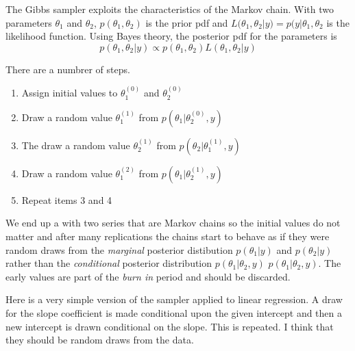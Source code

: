 \documentclass[12pt, a4paper, oneside]{article}\usepackage[]{graphicx}\usepackage[]{color}
\begin{document}
The Gibbs sampler exploits the characteristics of the Markov chain.  With two parameters $\theta_1$ and $\theta_2$, $p(\theta_1, \theta_2)$ is the prior pdf and $L(\theta_1, \theta_2 | y) = p(y | \theta_1, \theta_2$ is the likelihood function.  Using Bayes theory, the posterior pdf for the parameters is 
\begin{equation}
p(\theta_1, \theta_2| y) \propto p(\theta_1, \theta_2)L(\theta_1, \theta_2| y)
\end{equation}

There are a numbrer of steps. 
\begin{enumerate}
\item Assign initial values to $\theta_1^{(0)}$ and $\theta_2^{(0)}$
\item Draw a random value $\theta_1^{(1)}$ from $p(\theta_1|\theta_2^{(0)}, y)$
\item The draw a random value $\theta_2^{(1)}$ from $p(\theta_2|\theta_1^{(1)}, y)$
\item Draw a random value $\theta_1^{(2)}$ from $p(\theta_1|\theta_2^{(1)}, y)$
\item Repeat items 3 and 4
\end{enumerate}

We end up a with two series that are Markov chains so the initial values do not matter and after many replications the chains start to behave as if they were random draws from the \emph{marginal} posterior distibution $p(\theta_1 |y)$ and $p(\theta_2|y)$ rather than the \emph{conditional} posterior distribution $p(\theta_1| \theta_2, y)$ $p(\theta_1|\theta_2, y)$.  The early values are part of the \emph{burn in} period and should be discarded.   

Here is a very simple version of the sampler applied to linear regression.  A draw for the slope coefficient is made conditional upon the given intercept and then a new intercept is drawn conditional on the slope.  This is repeated.  I think that they should be random draws from the data.  
\end{document}

